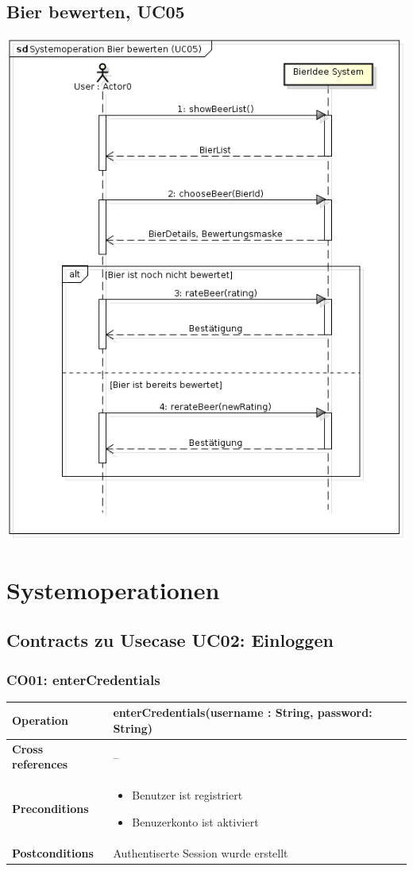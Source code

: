 \documentclass[10pt,a4paper]{scrartcl}
\begin{document}
\subsection{Bier bewerten, UC05}
\includegraphics[width=\textwidth]{ssd.uc05.png}

\section{Systemoperationen}
\subsection{Contracts zu Usecase UC02: Einloggen}
\subsubsection{CO01: enterCredentials}
\begin{tabular}{|l|p{}|}
\hline
 \textbf{Operation} & enterCredentials(username : String, password: String) \\ 
\hline
\textbf{Cross references} & -- \\ 
\hline 
\textbf{Preconditions} & \begin{itemize} 
							\item Benutzer ist registriert
							\item Benuzerkonto ist aktiviert 
						  \end{itemize}\\
\hline 
\textbf{Postconditions} & Authentiserte Session wurde erstellt \\
\hline
\end{tabular}
\end{document}
